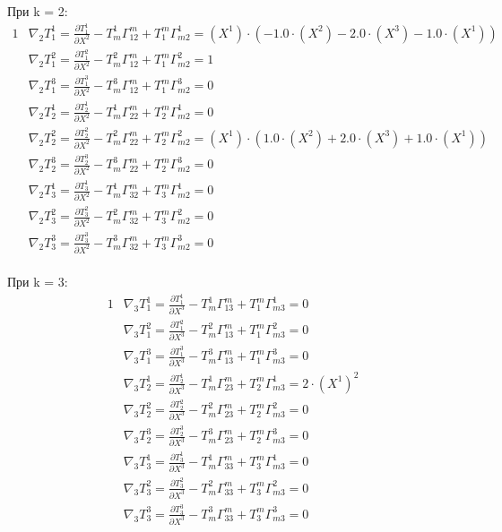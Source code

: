 \documentclass[a4paper, 12pt, oneside]{article}
\begin{document}
При k = 2:\\
\begin{alignat*}{1}
  & \nabla_2T^1_1 = \frac{\partial T^1_1}{\partial X^2} - T^1_m\Gamma^m_{12} + T^m_1\Gamma^1_{m2} = (X^1)\cdot (-1.0\cdot (X^2) - 2.0\cdot (X^3) - 1.0\cdot (X^1)) \\
  & \nabla_2T^2_1 = \frac{\partial T^2_1}{\partial X^2} - T^2_m\Gamma^m_{12} + T^m_1\Gamma^2_{m2} = 1 \\
  & \nabla_2T^3_1 = \frac{\partial T^3_1}{\partial X^2} - T^3_m\Gamma^m_{12} + T^m_1\Gamma^3_{m2} = 0 \\
  & \nabla_2T^1_2 = \frac{\partial T^1_2}{\partial X^2} - T^1_m\Gamma^m_{22} + T^m_2\Gamma^1_{m2} = 0 \\
  & \nabla_2T^2_2 = \frac{\partial T^2_2}{\partial X^2} - T^2_m\Gamma^m_{22} + T^m_2\Gamma^2_{m2} = (X^1)\cdot (1.0\cdot (X^2) + 2.0\cdot (X^3) + 1.0\cdot (X^1)) \\
  & \nabla_2T^3_2 = \frac{\partial T^3_2}{\partial X^2} - T^3_m\Gamma^m_{22} + T^m_2\Gamma^3_{m2} = 0 \\
  & \nabla_2T^1_3 = \frac{\partial T^1_3}{\partial X^2} - T^1_m\Gamma^m_{32} + T^m_3\Gamma^1_{m2} = 0 \\
  & \nabla_2T^2_3 = \frac{\partial T^2_3}{\partial X^2} - T^2_m\Gamma^m_{32} + T^m_3\Gamma^2_{m2} = 0 \\
  & \nabla_2T^3_3 = \frac{\partial T^3_3}{\partial X^2} - T^3_m\Gamma^m_{32} + T^m_3\Gamma^3_{m2} = 0 
\end{alignat*}\\
При k = 3:\\
\begin{alignat*}{1}
  & \nabla_3T^1_1 = \frac{\partial T^1_1}{\partial X^3} - T^1_m\Gamma^m_{13} + T^m_1\Gamma^1_{m3} = 0 \\
  & \nabla_3T^2_1 = \frac{\partial T^2_1}{\partial X^3} - T^2_m\Gamma^m_{13} + T^m_1\Gamma^2_{m3} = 0 \\
  & \nabla_3T^3_1 = \frac{\partial T^3_1}{\partial X^3} - T^3_m\Gamma^m_{13} + T^m_1\Gamma^3_{m3} = 0 \\
  & \nabla_3T^1_2 = \frac{\partial T^1_2}{\partial X^3} - T^1_m\Gamma^m_{23} + T^m_2\Gamma^1_{m3} = 2\cdot (X^1)^2 \\
  & \nabla_3T^2_2 = \frac{\partial T^2_2}{\partial X^3} - T^2_m\Gamma^m_{23} + T^m_2\Gamma^2_{m3} = 0 \\
  & \nabla_3T^3_2 = \frac{\partial T^3_2}{\partial X^3} - T^3_m\Gamma^m_{23} + T^m_2\Gamma^3_{m3} = 0 \\
  & \nabla_3T^1_3 = \frac{\partial T^1_3}{\partial X^3} - T^1_m\Gamma^m_{33} + T^m_3\Gamma^1_{m3} = 0 \\
  & \nabla_3T^2_3 = \frac{\partial T^2_3}{\partial X^3} - T^2_m\Gamma^m_{33} + T^m_3\Gamma^2_{m3} = 0 \\
  & \nabla_3T^3_3 = \frac{\partial T^3_3}{\partial X^3} - T^3_m\Gamma^m_{33} + T^m_3\Gamma^3_{m3} = 0 
\end{alignat*}\\
\end{document}
